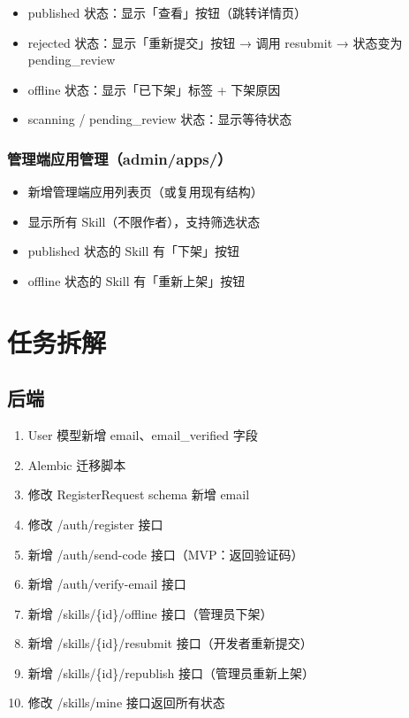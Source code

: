 \documentclass[11pt,a4paper]{article}
\begin{document}
\begin{itemize}[nosep]
  \item published 状态：显示「查看」按钮（跳转详情页）
  \item rejected 状态：显示「重新提交」按钮 → 调用 resubmit → 状态变为 pending\_review
  \item offline 状态：显示「已下架」标签 + 下架原因
  \item scanning / pending\_review 状态：显示等待状态
\end{itemize}

\subsubsection{管理端应用管理（admin/apps/）}

\begin{itemize}[nosep]
  \item 新增管理端应用列表页（或复用现有结构）
  \item 显示所有 Skill（不限作者），支持筛选状态
  \item published 状态的 Skill 有「下架」按钮
  \item offline 状态的 Skill 有「重新上架」按钮
\end{itemize}

\section{任务拆解}

\subsection{后端}

\begin{enumerate}[nosep]
  \item User 模型新增 email、email\_verified 字段
  \item Alembic 迁移脚本
  \item 修改 RegisterRequest schema 新增 email
  \item 修改 /auth/register 接口
  \item 新增 /auth/send-code 接口（MVP：返回验证码）
  \item 新增 /auth/verify-email 接口
  \item 新增 /skills/\{id\}/offline 接口（管理员下架）
  \item 新增 /skills/\{id\}/resubmit 接口（开发者重新提交）
  \item 新增 /skills/\{id\}/republish 接口（管理员重新上架）
  \item 修改 /skills/mine 接口返回所有状态
\end{enumerate}
\end{document}
